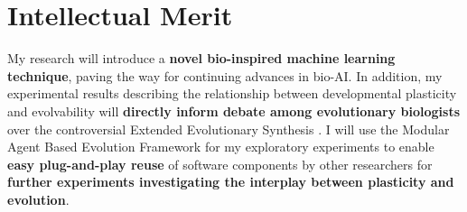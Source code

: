 \section{Intellectual Merit}
My research will introduce a \textbf{novel bio-inspired machine learning technique}, paving the way for continuing advances in bio-AI.
In addition, my experimental results describing the relationship between developmental plasticity and evolvability will \textbf{directly inform debate among evolutionary biologists} over the controversial Extended Evolutionary Synthesis \cite{Laland2014DoesRethink}.
I will use the Modular Agent Based Evolution Framework \cite{Hintze2017Mabe} for my exploratory experiments to enable \textbf{easy plug-and-play reuse} of software components by other researchers for \textbf{further experiments investigating the interplay between plasticity and evolution}.
